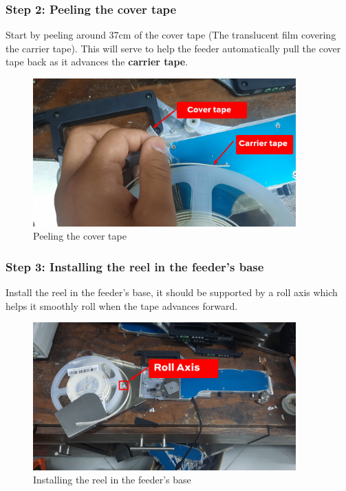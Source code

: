 \documentclass[a4paper,10pt]{report}
\begin{document}
\subsubsection{Step 2: Peeling the cover tape}
Start by peeling around 37cm of the cover tape (The translucent film covering the carrier tape). This will serve to help the feeder automatically pull the cover tape back as it advances the \textbf{carrier tape}.
\begin{figure}[!htb]
 \centering
 \includegraphics[width=0.9\textwidth]{images/step2.png}
 \caption{Peeling the cover tape}
\end{figure}
\subsubsection{Step 3: Installing the reel in the feeder's base}
Install the reel in the feeder's base, it should be supported by a roll axis which helps it smoothly roll when the tape advances forward.
\begin{figure}[!htb]
 \centering
 \includegraphics[width=0.9\textwidth]{images/step3.png}
 \caption{Installing the reel in the feeder's base}
\end{figure}
\newpage
\end{document}
